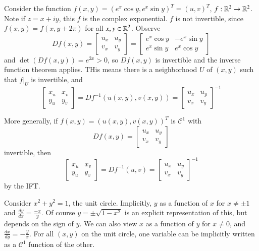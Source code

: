 \begin{example}
    Consider the function $f(x,y) = (e^x\cos y,e^x\sin y)^T = (u,v)^T$, $f:\mathbb R^2\rightarrow \mathbb R^2$. Note if $z = x+iy$, this $f$ is the complex exponential. $f$ is not invertible, since $f(x,y) = f(x,y+2\pi)$ for all $x,y \in \mathbb R^2$. Observe $$Df(x,y) = \begin{bmatrix} u_x & u_y \\ v_x & v_y \end{bmatrix} = \begin{bmatrix} e^x\cos y & -e^x\sin y \\ e^x\sin y & e^x \cos y\end{bmatrix}$$ and $\det(Df(x,y)) = e^{2x} > 0$, so $Df(x,y)$ is invertible and the inverse function theorem applies. THis means there is a neighborhood $U$ of $(x,y)$ such that $f\vert_U$ is invertible, and $$\begin{bmatrix} x_u & x_v \\ y_u & y_v \end{bmatrix} = Df^{-1}(u(x,y),v(x,y)) = \begin{bmatrix} u_x & u_y \\ v_x & v_y \end{bmatrix}^{-1}$$
\end{example}

\begin{example}
    More generally, if $f(x,y) = (u(x,y), v(x,y))^T$ is $\mathcal{C}^1$ with $$Df(x,y) = \begin{bmatrix} u_x & u_y \\ v_x & v_y\end{bmatrix}$$ invertible, then $$\begin{bmatrix} x_u & x_v \\ y_u & y_v \end{bmatrix} = Df^{-1}(u,v) = \begin{bmatrix} u_x & u_y \\ v_x & v_y \end{bmatrix}^{-1}$$ by the IFT.
\end{example}

\begin{example}
    Consider $x^2+y^2 = 1$, the unit circle. Implicitly, $y$ as a function of $x$ for $x \neq \pm 1$ and $\frac{dy}{dx} = \frac{-x}{y}$. Of course $y = \pm\sqrt{1-x^2}$ is an explicit representation of this, but depends on the sign of $y$. We can also view $x$ as a function of $y$ for $x \neq 0$, and $\frac{dx}{dy} = -\frac{y}{x}$. For all $(x,y)$ on the unit circle, one variable can be implicitly written as a $\mathcal{C}^1$ function of the other.
\end{example}

